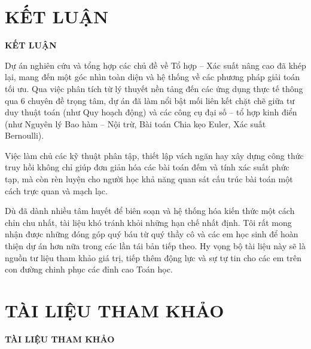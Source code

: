 \documentclass[12pt, a4paper]{article}
\begin{document}
\section{KẾT LUẬN}
\begin{tcolorbox}[colback=headerbg, colframe=maincolor, arc=3mm, boxrule=1.5pt, halign=center]
	\textbf{\LARGE KẾT LUẬN}
\end{tcolorbox}

\vspace{0.5cm}

\indent Dự án nghiên cứu và tổng hợp các chủ đề về Tổ hợp -- Xác suất nâng cao đã khép lại, mang đến một góc nhìn toàn diện và hệ thống về các phương pháp giải toán tối ưu. Qua việc phân tích từ lý thuyết nền tảng đến các ứng dụng thực tế thông qua 6 chuyên đề trọng tâm, dự án đã làm nổi bật mối liên kết chặt chẽ giữa tư duy thuật toán (như Quy hoạch động) và các công cụ đại số -- tổ hợp kinh điển (như Nguyên lý Bao hàm -- Nội trừ, Bài toán Chia kẹo Euler, Xác suất Bernoulli).
\vspace{0.3cm}

\indent Việc làm chủ các kỹ thuật phân tập, thiết lập vách ngăn hay xây dựng công thức truy hồi không chỉ giúp đơn giản hóa các bài toán đếm và tính xác suất phức tạp, mà còn rèn luyện cho người học khả năng quan sát cấu trúc bài toán một cách trực quan và mạch lạc.
\vspace{0.3cm}

\indent Dù đã dành nhiều tâm huyết để biên soạn và hệ thống hóa kiến thức một cách chỉn chu nhất, tài liệu khó tránh khỏi những hạn chế nhất định. Tôi rất mong nhận được những đóng góp quý báu từ quý thầy cô và các em học sinh để hoàn thiện dự án hơn nữa trong các lần tái bản tiếp theo. Hy vọng bộ tài liệu này sẽ là nguồn tư liệu tham khảo giá trị, tiếp thêm động lực và sự tự tin cho các em trên con đường chinh phục các đỉnh cao Toán học.
		
		\newpage
		\section*{TÀI LIỆU THAM KHẢO}
		
		\begin{tcolorbox}[colback=headerbg, colframe=maincolor, arc=3mm, boxrule=1.5pt, halign=center]
			\textbf{\LARGE TÀI LIỆU THAM KHẢO}
		\end{tcolorbox}
		
\end{document}
